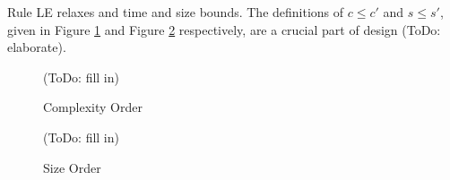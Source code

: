 \documentclass[preprint]{sigplanconf}
\begin{document}
Rule {\sc LE} relaxes and time and size bounds. The definitions of $c\leq c'$ and $s\leq s'$, given in Figure \ref{cle} and Figure \ref{sle} respectively, are a crucial part of design (ToDo: elaborate).

\begin{figure}
\begin{mathpar}
\end{mathpar}
(ToDo: fill in)
\caption{\label{cle}Complexity Order}
\end{figure}

\begin{figure}
\begin{mathpar}
\end{mathpar}
(ToDo: fill in)
\caption{\label{sle}Size Order}
\end{figure}
\end{document}
